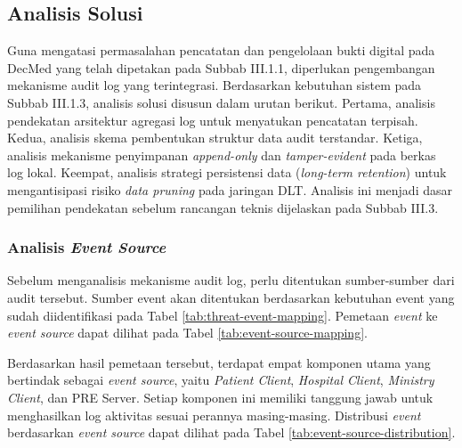 %

\subsection{Analisis Solusi}
\label{sec:analisis-solusi}

Guna mengatasi permasalahan pencatatan dan pengelolaan bukti digital pada DecMed yang telah dipetakan pada Subbab III.1.1, diperlukan pengembangan mekanisme audit log yang terintegrasi. Berdasarkan kebutuhan sistem pada Subbab III.1.3, analisis solusi disusun dalam urutan berikut. Pertama, analisis pendekatan arsitektur agregasi log untuk menyatukan pencatatan terpisah. Kedua, analisis skema pembentukan struktur data audit terstandar. Ketiga, analisis mekanisme penyimpanan \textit{append-only} dan \textit{tamper-evident} pada berkas log lokal. Keempat, analisis strategi persistensi data (\textit{long-term retention}) untuk mengantisipasi risiko \textit{data pruning} pada jaringan DLT. Analisis ini menjadi dasar pemilihan pendekatan sebelum rancangan teknis dijelaskan pada Subbab III.3.

\subsubsection{Analisis \textit{Event Source}}
\label{sec:analisis-event-source}

Sebelum menganalisis mekanisme audit log, perlu ditentukan sumber-sumber dari audit tersebut. Sumber event akan ditentukan berdasarkan kebutuhan event yang sudah diidentifikasi pada Tabel \ref{tab:threat-event-mapping}. Pemetaan \textit{event} ke \textit{event source} dapat dilihat pada Tabel \ref{tab:event-source-mapping}.

Berdasarkan hasil pemetaan tersebut, terdapat empat komponen utama yang bertindak sebagai \textit{event source}, yaitu \textit{Patient Client}, \textit{Hospital Client}, \textit{Ministry Client}, dan PRE Server. Setiap komponen ini memiliki tanggung jawab untuk menghasilkan log aktivitas sesuai perannya masing-masing. Distribusi \textit{event} berdasarkan \textit{event source} dapat dilihat pada Tabel \ref{tab:event-source-distribution}.

